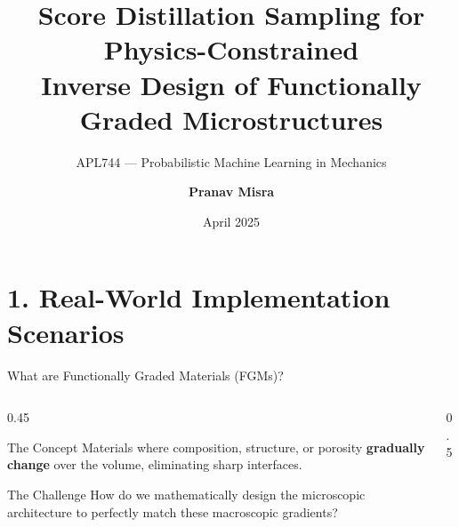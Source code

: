 \documentclass[aspectratio=169, 11pt]{beamer}
\title{\textbf{Score Distillation Sampling for Physics-Constrained\\Inverse Design of Functionally Graded Microstructures}}
\subtitle{APL744 — Probabilistic Machine Learning in Mechanics}
\author{\textbf{Pranav Misra}}
\date{April 2025}
\begin{document}
\maketitle

\section{1. Real-World Implementation Scenarios}

\begin{frame}{What are Functionally Graded Materials (FGMs)?}
  \begin{columns}
    \begin{column}{0.45\textwidth}
        \begin{block}{The Concept}
            Materials where composition, structure, or porosity \textbf{gradually change} over the volume, eliminating sharp interfaces.
        \end{block}
        
        \vspace{0.5em}
        \begin{alertblock}{The Challenge}
            How do we mathematically design the microscopic architecture to perfectly match these macroscopic gradients?
        \end{alertblock}
    \end{column}
    
    \begin{column}{0.5\textwidth}
        \centering
    \end{column}
  \end{columns}
\end{frame}
\end{document}
